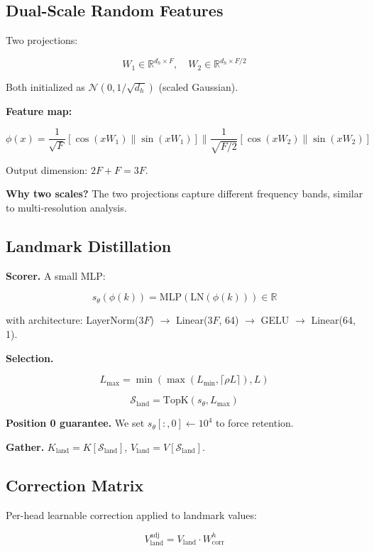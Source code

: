 \subsection{Dual-Scale Random Features}

Two projections:

\[
W_1 \in \mathbb{R}^{d_h \times F}, \quad W_2 \in \mathbb{R}^{d_h \times F/2}
\tag{4.1}
\]

Both initialized as $\mathcal{N}(0, 1/\sqrt{d_h})$ (scaled Gaussian).

\textbf{Feature map:}

\[
\phi(x) = \frac{1}{\sqrt{F}} [\cos(x W_1) \| \sin(x W_1)] \| \frac{1}{\sqrt{F/2}} [\cos(x W_2) \| \sin(x W_2)]
\tag{4.2}
\]

Output dimension: $2F + F = 3F$.

\textbf{Why two scales?} The two projections capture different frequency 
bands, similar to multi-resolution analysis.

\subsection{Landmark Distillation}

\textbf{Scorer.} A small MLP:

\[
s_\theta(\phi(k)) = \text{MLP}(\text{LN}(\phi(k))) \in \mathbb{R}
\tag{4.3}
\]

with architecture: LayerNorm($3F$) $\to$ Linear($3F$, 64) $\to$ GELU $\to$ Linear(64, 1).

\textbf{Selection.}

\[
L_\text{max} = \min\!\left(\max(L_\text{min}, \lceil \rho L \rceil), L\right)
\tag{4.4}
\]

\[
\mathcal{S}_\text{land} = \text{TopK}(s_\theta, L_\text{max})
\tag{4.5}
\]

\textbf{Position 0 guarantee.} We set $s_\theta[:, 0] \leftarrow 10^4$ to force 
retention.

\textbf{Gather.} $K_\text{land} = K[\mathcal{S}_\text{land}]$, $V_\text{land} = V[\mathcal{S}_\text{land}]$.

\subsection{Correction Matrix}

Per-head learnable correction applied to landmark values:

\[
V_\text{land}^\text{adj} = V_\text{land} \cdot W_\text{corr}^h
\tag{4.6}
\]

